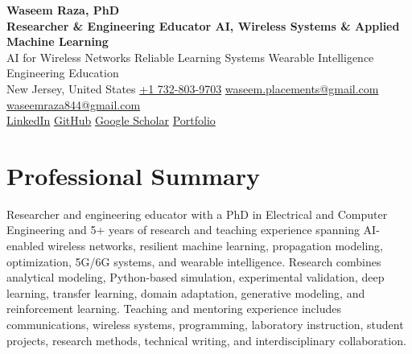 \documentclass[9pt,letterpaper]{extarticle}
\begin{document}
\begin{center}
{\LARGE\bfseries Waseem Raza, PhD}\\[2pt]
{\large\bfseries Researcher \& Engineering Educator \textbar{} AI, Wireless Systems \& Applied Machine Learning}\\[1pt]
{\small AI for Wireless Networks \textbar{} Reliable Learning Systems \textbar{} Wearable Intelligence \textbar{} Engineering Education}\\[3pt]
{\footnotesize New Jersey, United States \quad {}\enspace \href{tel:+17328039703}{+1 732-803-9703} \quad {}\enspace \href{mailto:waseem.placements@gmail.com}{waseem.placements@gmail.com} \textbar{} \href{mailto:waseemraza844@gmail.com}{waseemraza844@gmail.com}\\[1pt]\href{https://www.linkedin.com/in/waseem-raza-phd-9a737858/}{LinkedIn} \textbar{} \href{https://github.com/WaseemRaza844}{GitHub} \textbar{} \href{https://scholar.google.com/citations?user=d58Drr0AAAAJ\&hl=en}{Google Scholar} \textbar{} \href{https://waseemraza844.github.io/portfolio/}{Portfolio}}
\end{center}
\vspace{-5pt}
\section{Professional Summary}
Researcher and engineering educator with a PhD in Electrical and Computer Engineering and 5+ years of research and teaching experience spanning AI-enabled wireless networks, resilient machine learning, propagation modeling, optimization, 5G/6G systems, and wearable intelligence. Research combines analytical modeling, Python-based simulation, experimental validation, deep learning, transfer learning, domain adaptation, generative modeling, and reinforcement learning. Teaching and mentoring experience includes communications, wireless systems, programming, laboratory instruction, student projects, research methods, technical writing, and interdisciplinary collaboration.
\end{document}
